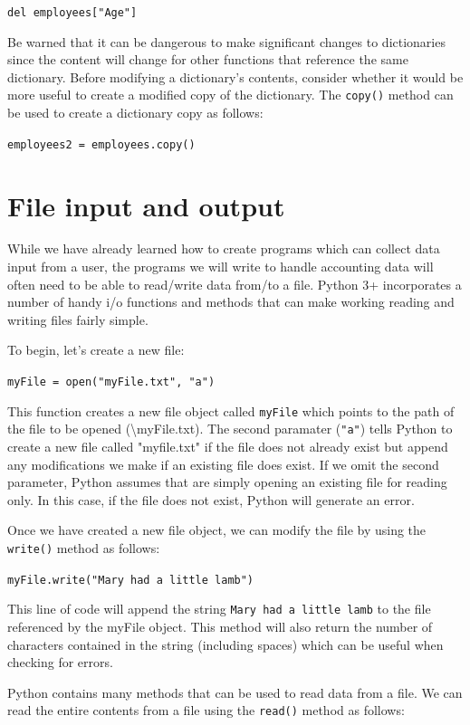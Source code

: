 \documentclass{book}
\begin{document}
\texttt{del employees["Age"]}

Be warned that it can be dangerous to make significant changes to dictionaries since the content will change for other functions that reference the same dictionary. Before modifying a dictionary's contents, consider whether it would be more useful to create a modified copy of the dictionary. The \texttt{copy()} method can be used to create a dictionary copy as follows:

\texttt{employees2 = employees.copy()}

\section{File input and output}
While we have already learned how to create programs which can collect data input from a user, the programs we will write to handle accounting data will often need to be able to read/write data from/to a file. Python 3+ incorporates a number of handy i/o functions and methods that can make working reading and writing files fairly simple.

To begin, let's create a new file:

\texttt{myFile = open("myFile.txt", "a")}

This function creates a new file object called \texttt{myFile} which points to the path of the file to be opened (\textbackslash myFile.txt). The second paramater (\texttt{"a"}) tells Python to create a new file called "myfile.txt" if the file does not already exist but append any modifications we make if an existing file does exist. If we omit the second parameter, Python assumes that are simply opening an existing file for reading only. In this case, if the file does not exist, Python will generate an error.

Once we have created a new file object, we can modify the file by using the \texttt{write()} method as follows:

\texttt{myFile.write("Mary had a little lamb")}

This line of code will append the string \texttt{Mary had a little lamb} to the file referenced by the myFile object. This method will also return the number of characters contained in the string (including spaces) which can be useful when checking for errors. 

Python contains many methods that can be used to read data from a file. We can read the entire contents from a file using the \texttt{read()} method as follows:
\end{document}
